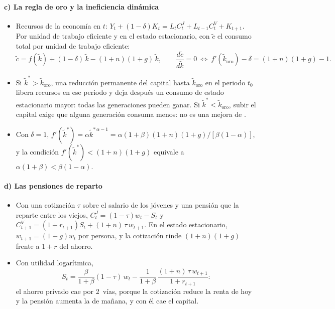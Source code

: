 \documentclass[11pt]{article}
\begin{document}
\paragraph{c) La regla de oro y la ineficiencia dinámica}

\begin{itemize}
\item Recursos de la economía en $t$: $Y_t+(1-\delta)K_t=L_tC^J_t+L_{t-1}C^V_t+K_{t+1}$. Por unidad de trabajo eficiente y en el estado estacionario, con $\tilde c$ el consumo total por unidad de trabajo eficiente:
  \begin{equation*}
  \tilde c=f(\tilde k)+(1-\delta)\,\tilde k-(1+n)(1+g)\,\tilde k,\qquad\frac{d\tilde c}{d\tilde k}=0\ \Longleftrightarrow\ f'(\tilde k_{\mathrm{oro}})-\delta=(1+n)(1+g)-1.
  \end{equation*}
\item Si $\tilde k^*>\tilde k_{\mathrm{oro}}$, una reducción permanente del capital hasta $\tilde k_{\mathrm{oro}}$ en el periodo $t_0$ libera recursos en ese periodo y deja después un consumo de estado estacionario mayor: todas las generaciones pueden ganar. Si $\tilde k^*<\tilde k_{\mathrm{oro}}$, subir el capital exige que alguna generación consuma menos: no es una mejora de .
\item Con $\delta=1$, $f'(\tilde k^*)=\alpha \tilde k^{*\,\alpha-1}=\alpha(1+\beta)(1+n)(1+g)/[\beta(1-\alpha)]$, y la condición $f'(\tilde k^*)<(1+n)(1+g)$ equivale a $\alpha(1+\beta)<\beta(1-\alpha)$. \findemo
\end{itemize}

\paragraph{d) Las pensiones de reparto}

\begin{itemize}
\item Con una cotización $\tau$ sobre el salario de los jóvenes y una pensión que la reparte entre los viejos, $C^J_t=(1-\tau)w_t-S_t$ y $C^V_{t+1}=(1+r_{t+1})S_t+(1+n)\,\tau\,w_{t+1}$. En el estado estacionario, $w_{t+1}=(1+g)w_t$ por persona, y la cotización rinde $(1+n)(1+g)$ frente a $1+r$ del ahorro\nocite{Aaron1966Social}.
\item Con utilidad logarítmica,
  \begin{equation*}
  S_t=\frac{\beta}{1+\beta}(1-\tau)\,w_t-\frac{1}{1+\beta}\,\frac{(1+n)\,\tau\,w_{t+1}}{1+r_{t+1}}:
  \end{equation*}
  el ahorro privado cae por 2~vías, porque la cotización reduce la renta de hoy y la pensión aumenta la de mañana, y con él cae el capital. \findemo
\end{itemize}
\end{document}

